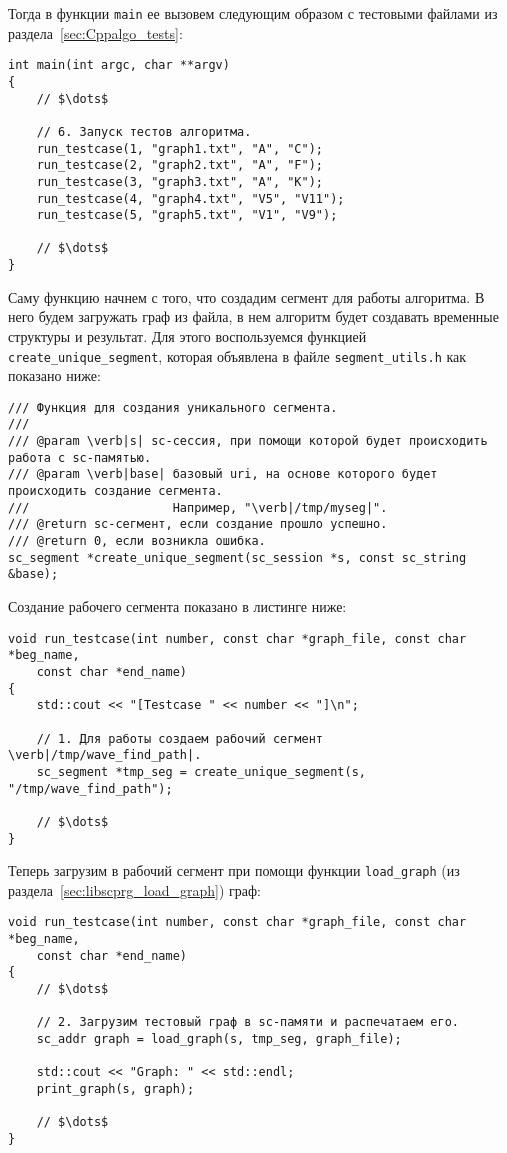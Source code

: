 Тогда в функции \lstinline|main| ее вызовем следующим образом с
тестовыми файлами из раздела~\ref{sec:Cppalgo_tests}:
\begin{lstlisting}[texcl]
int main(int argc, char **argv)
{
    // $\dots$

    // 6. Запуск тестов алгоритма.
    run_testcase(1, "graph1.txt", "A", "C");
    run_testcase(2, "graph2.txt", "A", "F");
    run_testcase(3, "graph3.txt", "A", "K");
    run_testcase(4, "graph4.txt", "V5", "V11");
    run_testcase(5, "graph5.txt", "V1", "V9");

    // $\dots$
}
\end{lstlisting}

Саму функцию начнем с того, что создадим сегмент для работы
алгоритма. В него будем загружать граф из файла, в нем алгоритм будет
создавать временные структуры и результат. Для этого воспользуемся
функцией \lstinline|create_unique_segment|, которая объявлена в файле
\verb|segment_utils.h| как показано ниже:
\begin{lstlisting}[texcl]
/// Функция для создания уникального сегмента.
///
/// @param \verb|s| sc-сессия, при помощи которой будет происходить работа с sc-памятью.
/// @param \verb|base| базовый uri, на основе которого будет происходить создание сегмента.
///                    Например, "\verb|/tmp/myseg|".
/// @return sc-сегмент, если создание прошло успешно.
/// @return 0, если возникла ошибка.
sc_segment *create_unique_segment(sc_session *s, const sc_string &base);
\end{lstlisting}

Создание рабочего сегмента показано в листинге ниже:
\begin{lstlisting}[texcl]
void run_testcase(int number, const char *graph_file, const char *beg_name,
    const char *end_name)
{
    std::cout << "[Testcase " << number << "]\n";

    // 1. Для работы создаем рабочий сегмент \verb|/tmp/wave_find_path|.
    sc_segment *tmp_seg = create_unique_segment(s, "/tmp/wave_find_path");

    // $\dots$
}
\end{lstlisting}

Теперь загрузим в рабочий сегмент при помощи функции
\lstinline|load_graph| (из раздела~\ref{sec:libscprg_load_graph})
граф:
\begin{lstlisting}[texcl]
void run_testcase(int number, const char *graph_file, const char *beg_name,
    const char *end_name)
{
    // $\dots$

    // 2. Загрузим тестовый граф в sc-памяти и распечатаем его.
    sc_addr graph = load_graph(s, tmp_seg, graph_file);

    std::cout << "Graph: " << std::endl;
    print_graph(s, graph);

    // $\dots$
}
\end{lstlisting}

